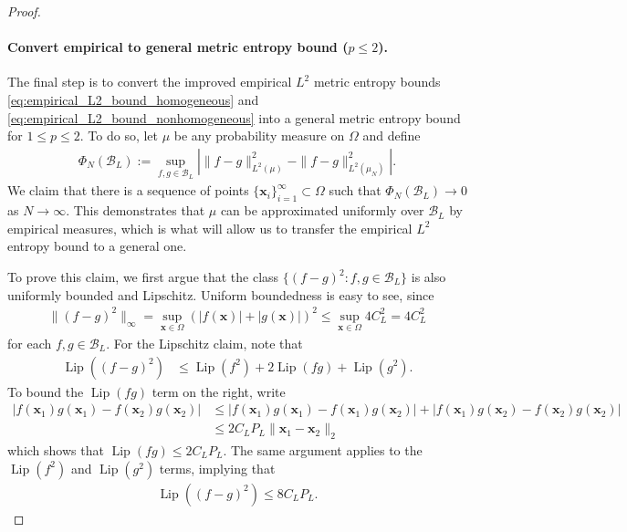 \documentclass{article}
\DeclareMathOperator{\Lip}{\mathrm{Lip}}
\def\vx{{\bm{x}}}
\def\cB{{\mathcal{B}}}
\begin{document}
\begin{appendices}
\begin{proof}
    \paragraph{Convert empirical to general metric entropy bound ($p \leq 2$).} The final step is to convert the improved empirical $L^2$ metric entropy bounds \eqref{eq:empirical_L2_bound_homogeneous} and \eqref{eq:empirical_L2_bound_nonhomogeneous} into a general metric entropy bound for $1 \leq p \leq 2$. To do so, let $\mu$ be any probability measure on $\Omega$ and define
    \begin{align} \label{eq:empirical_measure_approx_2}
        \Phi_N(\cB_L) := \sup_{f,g \in \cB_L} \left| \| f - g \|_{L^2(\mu)}^2 - \| f - g \|_{L^2(\mu_N)}^2 \right|.
    \end{align}
    We claim that there is a sequence of points $\{ \vx_i \}_{i=1}^\infty \subset \Omega$ such that $\Phi_N(\cB_L) \to 0$ as $N \to \infty$. This demonstrates that $\mu$ can be approximated uniformly over $\cB_L$ by empirical measures, which is what will allow us to transfer the empirical $L^2$ entropy bound to a general one.
    
    To prove this claim, we first argue that the class $\{ (f-g)^2: f,g \in \cB_L \}$ is also uniformly bounded and Lipschitz. Uniform boundedness is easy to see, since
    \begin{align}
        \| (f-g)^2 \|_\infty = \sup_{\vx \in \Omega} (|f(\vx)| + |g(\vx)|)^2 \leq \sup_{\vx \in \Omega} 4 C_L^2 = 4 C_L^2
    \end{align}
    for each $f,g \in \cB_L$. For the Lipschitz claim, note that
    \begin{align}
        \Lip((f-g)^2) &\leq \Lip(f^2) + 2\Lip(fg) + \Lip(g^2).
    \end{align}
    To bound the $\Lip(fg)$ term on the right, write
    \begin{align}
        |f(\vx_1) g(\vx_1) - f(\vx_2) g(\vx_2)| &\leq |f(\vx_1) g(\vx_1) - f(\vx_1) g(\vx_2)| +| f(\vx_1) g(\vx_2) -f(\vx_2) g(\vx_2)| \\
        &\leq 2 C_L P_L \| \vx_1 - \vx_2 \|_2
    \end{align}
    which shows that $\Lip(fg) \leq 2 C_L P_L$. The same argument applies to the $\Lip(f^2)$ and $\Lip(g^2)$ terms, implying that
    \begin{align}
        \Lip((f-g)^2) \leq 8 C_L P_L.
    \end{align}
 

\end{proof}
\end{appendices}
\end{document}
